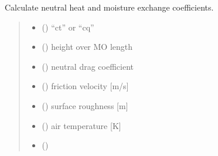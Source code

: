 \documentclass[letterpaper,10pt,english]{sphinxmanual}
\begin{document}
\begin{fulllineitems}
\label{\detokenize{users_guide:AirSeaFluxCode.flux_subs.heat_coef.ctqn_calc}}
\pysigstartsignatures
\pysiglinewithargsret
{}
{\sphinxparamcomma {}\sphinxparamcomma {}\sphinxparamcomma {}\sphinxparamcomma {}\sphinxparamcomma {}\sphinxparamcomma {}}
{}
\pysigstopsignatures
\sphinxAtStartPar
Calculate neutral heat and moisture exchange coefficients.
\begin{quote}\begin{description}
\begin{itemize}
\item {}
\sphinxAtStartPar
{} () \textendash{} “ct” or “cq”

\item {}
\sphinxAtStartPar
{} () \textendash{} height over MO length

\item {}
\sphinxAtStartPar
{} () \textendash{} neutral drag coefficient

\item {}
\sphinxAtStartPar
{} () \textendash{} friction velocity      {[}m/s{]}

\item {}
\sphinxAtStartPar
{} () \textendash{} surface roughness       {[}m{]}

\item {}
\sphinxAtStartPar
{} () \textendash{} air temperature         {[}K{]}

\item {}
\sphinxAtStartPar
{} ()


\end{itemize}
\end{description}
\end{quote}
\end{fulllineitems}
\end{document}
